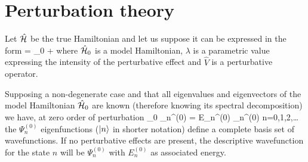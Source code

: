 \section{Perturbation theory}

Let $\hat{\mathcal{H}}$ be the true Hamiltonian and let us suppose it can be expressed in
the form 
\beq
\ham = \ham_{0} + \lambda {}
\eeq
where $\hat{\mathcal{H}}_{0}$ is a model Hamiltonian, $\lambda$ is a parametric value
expressing the intensity of the perturbative effect and $\hat{V}$ is a
perturbative operator. 

Supposing a non-degenerate case and that all eigenvalues and eigenvectors of
the model Hamiltonian $\hat{\mathcal{H}}_{0}$ are known (therefore knowing its spectral
decomposition) we have, at zero order of perturbation
\beq
\ham_{0} \Psi_n^{(0)} = E_n^{(0)} \Psi_n^{(0)} \quad n=0,1,2,\ldots
\eeq
the $\Psi_n^{(0)}$ eigenfunctions ($\left| n \right\rangle$ in shorter notation) define a
complete basis set of wavefunctions. If no perturbative effects are present,
the descriptive wavefunction for the state $n$ will be $\Psi_n^{(0)}$ with
$E_n^{(0)}$ as associated energy.

